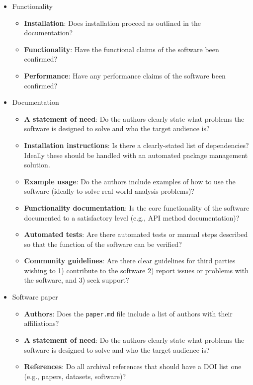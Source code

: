 \documentclass{article}
\begin{document}
\begin{itemize}
\item Functionality

\begin{itemize}
    \item \textbf{Installation}: Does installation proceed as outlined in the documentation?
    \item \textbf{Functionality}: Have the functional claims of the software been confirmed?
    \item \textbf{Performance}: Have any performance claims of the software been confirmed?
\end{itemize}


\item Documentation

\begin{itemize}
    \item \textbf{A statement of need}: Do the authors clearly state what problems the software is designed to solve and who the target audience is?
    \item \textbf{Installation instructions}: Is there a clearly-stated list of dependencies? Ideally these should be handled with an automated package management solution.
    \item \textbf{Example usage}: Do the authors include examples of how to use the software (ideally to solve real-world analysis problems)?
    \item \textbf{Functionality documentation}: Is the core functionality of the software documented to a satisfactory level (e.g., API method documentation)?
    \item \textbf{Automated tests}: Are there automated tests or manual steps described so that the function of the software can be verified?
    \item \textbf{Community guidelines}: Are there clear guidelines for third parties wishing to 1) contribute to the software 2) report issues or problems with the software, and 3) seek support?
\end{itemize}

\item Software paper

\begin{itemize}
    \item \textbf{Authors}: Does the \texttt{paper.md} file include a list of authors with their affiliations?
    \item \textbf{A statement of need}: Do the authors clearly state what problems the software is designed to solve and who the target audience is?
    \item \textbf{References}: Do all archival references that should have a DOI list one (e.g., papers, datasets, software)?
\end{itemize}

\end{itemize}
\end{document}
